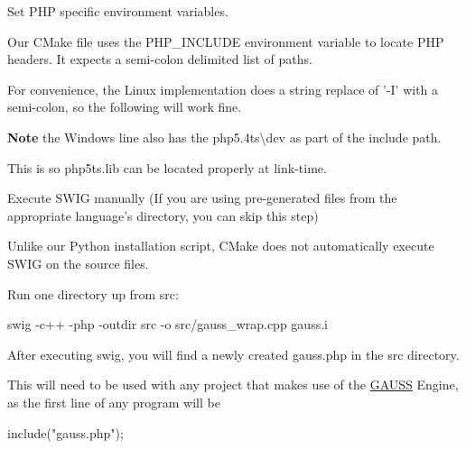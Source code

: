 \begin{DoxyEnumerate}
\item Set P\-H\-P specific environment variables.

Our C\-Make file uses the {\ttfamily P\-H\-P\-\_\-\-I\-N\-C\-L\-U\-D\-E} environment variable to locate P\-H\-P headers. It expects a semi-\/colon delimited list of paths.

For convenience, the Linux implementation does a string replace of '{\ttfamily -\/\-I}' with a semi-\/colon, so the following will work fine. 


{\bfseries Note} the Windows line also has the {\ttfamily php5.\-4ts\textbackslash{}dev} as part of the include path.

This is so {\ttfamily php5ts.\-lib} can be located properly at link-\/time.
\item Execute S\-W\-I\-G manually (If you are using pre-\/generated files from the appropriate language's directory, you can skip this step)

Unlike our Python installation script, C\-Make does not automatically execute S\-W\-I\-G on the source files.

Run one directory up from {\ttfamily src}\-: \begin{DoxyVerb}swig -c++ -php -outdir src -o src/gauss_wrap.cpp gauss.i
\end{DoxyVerb}

\end{DoxyEnumerate}

After executing {\ttfamily swig}, you will find a newly created {\ttfamily gauss.\-php} in the {\ttfamily src} directory.

This will need to be used with any project that makes use of the \hyperlink{class_g_a_u_s_s}{G\-A\-U\-S\-S} Engine, as the first line of any program will be \begin{DoxyVerb}include("gauss.php");
\end{DoxyVerb}



